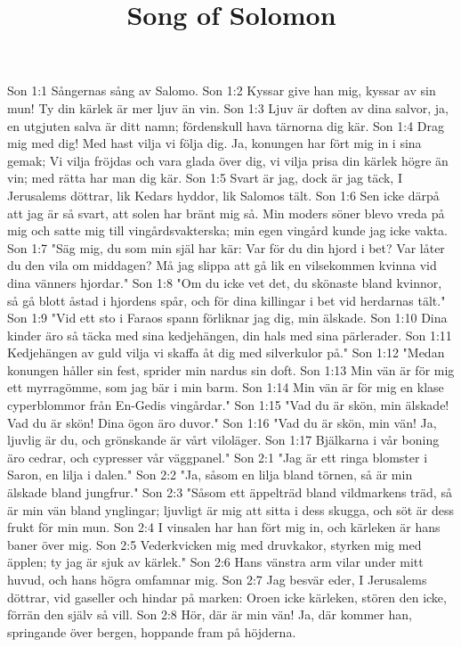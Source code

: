 

\title{Song of Solomon}

Son 1:1  Sångernas sång av Salomo.
Son 1:2  Kyssar give han mig, kyssar av sin mun! Ty din kärlek är mer ljuv än vin.
Son 1:3  Ljuv är doften av dina salvor, ja, en utgjuten salva är ditt namn; fördenskull hava tärnorna dig kär.
Son 1:4  Drag mig med dig! Med hast vilja vi följa dig. Ja, konungen har fört mig in i sina gemak; Vi vilja fröjdas och vara glada över dig, vi vilja prisa din kärlek högre än vin; med rätta har man dig kär.
Son 1:5  Svart är jag, dock är jag täck, I Jerusalems döttrar, lik Kedars hyddor, lik Salomos tält.
Son 1:6  Sen icke därpå att jag är så svart, att solen har bränt mig så. Min moders söner blevo vreda på mig och satte mig till vingårdsvakterska; min egen vingård kunde jag icke vakta.
Son 1:7  "Säg mig, du som min själ har kär: Var för du din hjord i bet? Var låter du den vila om middagen? Må jag slippa att gå lik en vilsekommen kvinna vid dina vänners hjordar."
Son 1:8  "Om du icke vet det, du skönaste bland kvinnor, så gå blott åstad i hjordens spår, och för dina killingar i bet vid herdarnas tält."
Son 1:9  "Vid ett sto i Faraos spann förliknar jag dig, min älskade.
Son 1:10  Dina kinder äro så täcka med sina kedjehängen, din hals med sina pärlerader.
Son 1:11  Kedjehängen av guld vilja vi skaffa åt dig med silverkulor på."
Son 1:12  "Medan konungen håller sin fest, sprider min nardus sin doft.
Son 1:13  Min vän är för mig ett myrragömme, som jag bär i min barm.
Son 1:14  Min vän är för mig en klase cyperblommor från En-Gedis vingårdar."
Son 1:15  "Vad du är skön, min älskade! Vad du är skön! Dina ögon äro duvor."
Son 1:16  "Vad du är skön, min vän! Ja, ljuvlig är du, och grönskande är vårt viloläger.
Son 1:17  Bjälkarna i vår boning äro cedrar, och cypresser vår väggpanel."
Son 2:1  "Jag är ett ringa blomster i Saron, en lilja i dalen."
Son 2:2  "Ja, såsom en lilja bland törnen, så är min älskade bland jungfrur."
Son 2:3  "Såsom ett äppelträd bland vildmarkens träd, så är min vän bland ynglingar; ljuvligt är mig att sitta i dess skugga, och söt är dess frukt för min mun.
Son 2:4  I vinsalen har han fört mig in, och kärleken är hans baner över mig.
Son 2:5  Vederkvicken mig med druvkakor, styrken mig med äpplen; ty jag är sjuk av kärlek."
Son 2:6  Hans vänstra arm vilar under mitt huvud, och hans högra omfamnar mig.
Son 2:7  Jag besvär eder, I Jerusalems döttrar, vid gaseller och hindar på marken: Oroen icke kärleken, stören den icke, förrän den själv så vill.
Son 2:8  Hör, där är min vän! Ja, där kommer han, springande över bergen, hoppande fram på höjderna.
